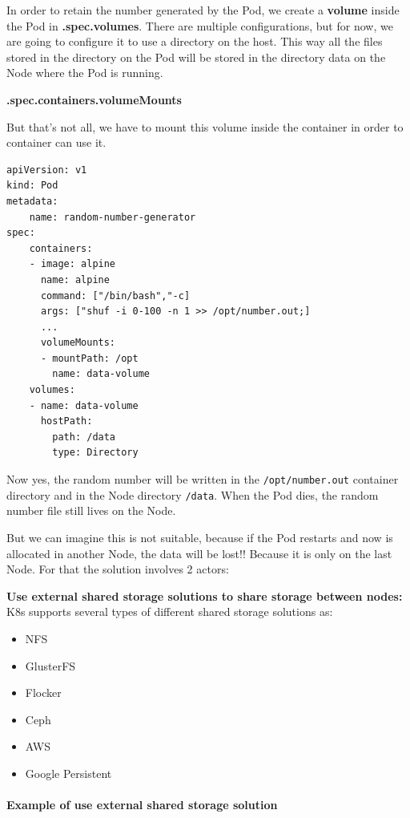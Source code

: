 \documentclass{article}
\newenvironment{codetemplate}[1][]{%
  \mybasecolorbox[#1]
  \itshape
}{%
  \endmybasecolorbox
}
\begin{document}
In order to retain the number generated by the Pod, we create a \textbf{volume} inside the Pod in  \textbf{.spec.volumes}. There are multiple configurations, but for now, we are going to configure it to use a directory on the host. This way all the files stored in the directory on the Pod will be stored in the directory data on the Node where the Pod is running.

\textbf{.spec.containers.volumeMounts}

But that's not all,  we have to mount this volume inside the container in order to container can use it.

\begin{codetemplate}{}
\begin{verbatim}
apiVersion: v1
kind: Pod
metadata:
    name: random-number-generator
spec:
    containers:
    - image: alpine
      name: alpine
      command: ["/bin/bash","-c]
      args: ["shuf -i 0-100 -n 1 >> /opt/number.out;]
      ...
      volumeMounts:
      - mountPath: /opt
        name: data-volume
    volumes:
    - name: data-volume
      hostPath:
        path: /data
        type: Directory
\end{verbatim}
\end{codetemplate}

Now yes, the random number will be written in the \verb|/opt/number.out| container directory and in the Node directory \verb|/data|. When the Pod dies, the random number file still lives on the Node.

But we can imagine this is not suitable, because if the Pod restarts and now is allocated in another Node, the data will be lost!! Because it is only on the last Node. For that the solution involves 2 actors:

\textbf{Use external shared storage solutions to share storage between nodes:} K8s supports several types of different shared storage solutions as:
\begin{itemize}
    \item NFS
    \item GlusterFS
    \item Flocker
    \item Ceph
    \item AWS
    \item Google Persistent
\end{itemize}

\paragraph{Example of use external shared storage solution}
\end{document}
